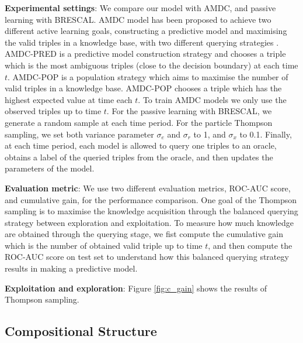 \textbf{Experimental settings}: 
We compare our model with AMDC, and passive learning with BRESCAL.  
AMDC model has been proposed to achieve two different active learning goals, constructing a predictive
model and maximising the valid triples in a knowledge base, with two different querying strategies
 \cite{kajino2015active}. 
AMDC-PRED is a predictive model construction strategy and chooses a triple which is the most ambiguous triples (close to the decision boundary) at each time $t$.
AMDC-POP is a population strategy which aims to maximise the number of valid triples in a knowledge base. AMDC-POP chooses a triple which has the highest expected value at time each $t$.  
To train AMDC models we only use the observed triples up to time $t$. For the passive learning with BRESCAL, we generate a random sample at each time period.
For the particle Thompson sampling, we set both variance parameter $\sigma_e$ and $\sigma_r$ to 1, and $
\sigma_x$ to 0.1. 
Finally, at each time period, each model is allowed to query one triples to an oracle, obtains a label of the
queried triples from the oracle, and then updates the parameters of the model. 

\textbf{Evaluation metric}: We use two different evaluation metrics, ROC-AUC score, and cumulative gain,
for the performance comparison. One goal of the Thompson sampling is to maximise the knowledge 
acquisition through the balanced querying strategy between exploration and exploitation. 
To measure how much knowledge are obtained through the querying stage, we fist compute the cumulative 
gain which is the number of obtained valid triple up to time $t$, and then compute the ROC-AUC score on 
test set to understand how this balanced querying strategy results in making a predictive model.
 
\textbf{Exploitation and exploration}: Figure \ref{fig:c_gain} shows the results of Thompson sampling.

\subsection{Compositional Structure}


